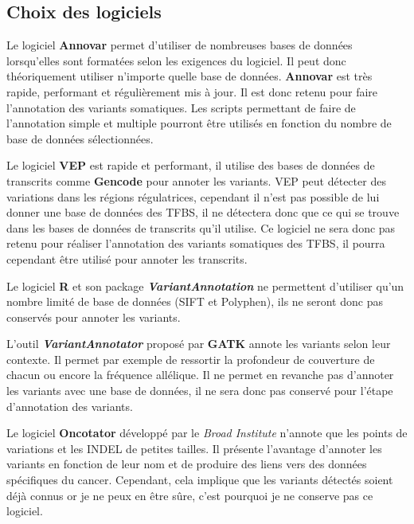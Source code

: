 \subsection{Choix des logiciels}

Le logiciel \textbf{Annovar} permet d'utiliser de nombreuses bases de données lorsqu'elles sont formatées selon les exigences du logiciel. Il peut donc théoriquement utiliser n'importe quelle base de données. \textbf{Annovar} est très rapide, performant et régulièrement mis à jour. Il est donc retenu pour faire l'annotation des variants somatiques. Les scripts permettant de faire de l'annotation simple et multiple pourront être utilisés en fonction du nombre de base de données sélectionnées.

Le logiciel \textbf{VEP} est rapide et performant, il utilise des bases de données de transcrits comme \textbf{Gencode} pour annoter les variants. VEP peut détecter des variations dans les régions régulatrices, cependant il n'est pas possible de lui donner une base de données des TFBS, il ne détectera donc que ce qui se trouve dans les bases de données de transcrits qu'il utilise. Ce logiciel ne sera donc pas retenu pour réaliser l'annotation des variants somatiques des TFBS, il pourra cependant être utilisé pour annoter les transcrits.

Le logiciel \textbf{R} et son package \textit{\textbf{VariantAnnotation}} ne permettent d'utiliser qu'un nombre limité de base de données (SIFT et Polyphen), ils ne seront donc pas conservés pour annoter les variants.

L'outil \textit{\textbf{VariantAnnotator}} proposé par \textbf{GATK} annote les variants selon leur contexte. Il permet par exemple de ressortir la profondeur de couverture de chacun ou encore la fréquence allélique. Il ne permet en revanche pas d'annoter les variants avec une base de données, il ne sera donc pas conservé pour l'étape d'annotation des variants.

Le logiciel \textbf{Oncotator} développé par le \textit{Broad Institute} n'annote que les points de variations et les INDEL de petites tailles. Il présente l'avantage d'annoter les variants en fonction de leur nom et de produire des liens vers des données spécifiques du cancer. Cependant, cela implique que les variants détectés soient déjà connus or je ne peux en être sûre, c'est pourquoi je ne conserve pas ce logiciel.

